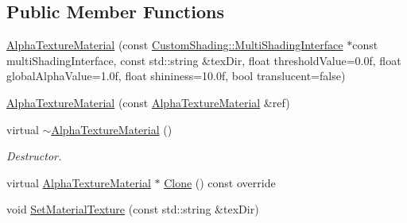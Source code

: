 \subsection*{Public Member Functions}
\begin{DoxyCompactItemize}
\item 
\mbox{\hyperlink{class_geometry_engine_1_1_geometry_material_1_1_alpha_texture_material_a7ab1f51006d0b2613ef4be29c6e07c2c}{Alpha\+Texture\+Material}} (const \mbox{\hyperlink{class_geometry_engine_1_1_custom_shading_1_1_multi_shading_interface}{Custom\+Shading\+::\+Multi\+Shading\+Interface}} $\ast$const multi\+Shading\+Interface, const std\+::string \&tex\+Dir, float threshold\+Value=0.\+0f, float global\+Alpha\+Value=1.\+0f, float shininess=10.\+0f, bool translucent=false)
\item 
\mbox{\hyperlink{class_geometry_engine_1_1_geometry_material_1_1_alpha_texture_material_a3ba50a82f2bacaba7c0c66e032e9452b}{Alpha\+Texture\+Material}} (const \mbox{\hyperlink{class_geometry_engine_1_1_geometry_material_1_1_alpha_texture_material}{Alpha\+Texture\+Material}} \&ref)
\item 
\mbox{\label{class_geometry_engine_1_1_geometry_material_1_1_alpha_texture_material_afc7f6aceb25713feaddf391b110e79a3}} 
virtual \mbox{\hyperlink{class_geometry_engine_1_1_geometry_material_1_1_alpha_texture_material_afc7f6aceb25713feaddf391b110e79a3}{$\sim$\+Alpha\+Texture\+Material}} ()
\begin{DoxyCompactList}\small\item\em Destructor. \end{DoxyCompactList}\item 
virtual \mbox{\hyperlink{class_geometry_engine_1_1_geometry_material_1_1_alpha_texture_material}{Alpha\+Texture\+Material}} $\ast$ \mbox{\hyperlink{class_geometry_engine_1_1_geometry_material_1_1_alpha_texture_material_a27375f0008fcdeaacb49fb4266f9f480}{Clone}} () const override
\item 
void \mbox{\hyperlink{class_geometry_engine_1_1_geometry_material_1_1_alpha_texture_material_a8f151748d894f89722bf6515a832aa8d}{Set\+Material\+Texture}} (const std\+::string \&tex\+Dir)
\item 
\mbox{\label{class_geometry_engine_1_1_geometry_material_1_1_alpha_texture_material_af2339e0ddb95a9b39cfce856d218819c}} 

\end{DoxyCompactItemize}
